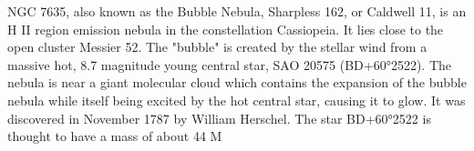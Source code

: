 NGC 7635, also known as the Bubble Nebula, Sharpless 162, or Caldwell 11, is an H II region emission nebula in the constellation Cassiopeia. It lies close to the open cluster Messier 52. The "bubble" is created by the stellar wind from a massive hot, 8.7 magnitude young central star, SAO 20575 (BD+60°2522). The nebula is near a giant molecular cloud which contains the expansion of the bubble nebula while itself being excited by the hot central star, causing it to glow. It was discovered in November 1787 by William Herschel. The star BD+60°2522 is thought to have a mass of about 44 M
